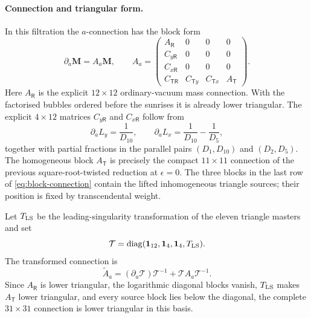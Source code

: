 \documentclass[11pt]{article}
\newcommand{\T}{\mathsf T}
\newcommand{\R}{\mathsf R}
\begin{document}
\paragraph{Connection and triangular form.}
In this filtration the $a$-connection has the block form
\begin{equation}
 \partial_a\bm M=A_a\bm M,
 \qquad
 A_a=
 \begin{pmatrix}
 A_{\R}       &0       &0       &0\\
 C_{y\R}      &0       &0       &0\\
 C_{x\R}      &0       &0       &0\\
 C_{\T\R}     &C_{\T y}&C_{\T x}&A_{\T}
 \end{pmatrix}.
 \label{eq:block-connection}
\end{equation}
Here $A_{\R}$ is the explicit $12\times12$ ordinary-vacuum mass
connection.  With the factorised bubbles ordered before the sunrises it
is already lower triangular.  The explicit $4\times12$ matrices
$C_{y\R}$ and $C_{x\R}$ follow from
\begin{equation}
 \partial_aL_y=\frac1{D_{10}},\qquad
 \partial_aL_x=\frac1{D_{10}}-\frac1{D_5},
\end{equation}
together with partial fractions in the parallel pairs $(D_1,D_{10})$ and
$(D_2,D_5)$.  The homogeneous block $A_{\T}$ is precisely the compact
$11\times11$ connection of the previous square-root-twisted reduction at
$\epsilon=0$.  The three blocks in the last row of
\eqref{eq:block-connection} contain the lifted inhomogeneous triangle
sources; their position is fixed by transcendental weight.

Let $T_{\rm LS}$ be the leading-singularity transformation of the eleven
triangle masters and set
\begin{equation}
 \mathcal T=\operatorname{diag}(\mathbf 1_{12},\mathbf 1_4,
 \mathbf 1_4,T_{\rm LS}).
\end{equation}
The transformed connection is
\begin{equation}
 \widetilde A_a=(\partial_a\mathcal T)\mathcal T^{-1}
 +\mathcal T A_a\mathcal T^{-1}.
\end{equation}
Since $A_{\R}$ is lower triangular, the logarithmic diagonal blocks
vanish, $T_{\rm LS}$ makes $A_{\T}$ lower triangular, and every source
block lies below the diagonal, the complete $31\times31$ connection is
lower triangular in this basis.
\end{document}
